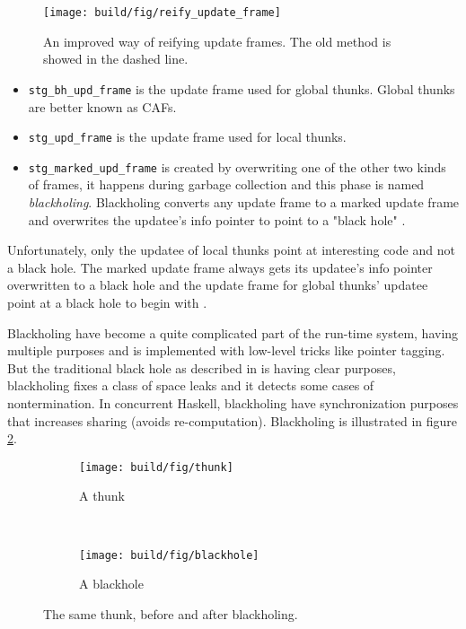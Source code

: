 \begin{figure}
\begin{mdframed}
  \texttt{[image: build/fig/reify\_update\_frame]}
  \caption{An improved way of reifying update frames. The old method is
  showed in the dashed line.}
  \label{fig:reify_update_frame}
\end{mdframed}
\end{figure}

\begin{itemize}
  \item
    \texttt{stg\_bh\_upd\_frame} is the update frame used for global
      thunks. Global thunks are better known as CAFs.
  \item
    \texttt{stg\_upd\_frame} is the update frame used for local
  thunks.
  \item
     \texttt{stg\_marked\_upd\_frame} is created
  by overwriting one of the other two kinds of frames, it
  happens during garbage collection and this phase is named
  \emph{blackholing}. Blackholing converts any update frame to a
  marked update frame \cite{github_overwrite_update_frame} and
  overwrites the updatee's info pointer to point to a "black hole"
  \cite{github_overwrite_blackhole}.
\end{itemize}

Unfortunately, only the updatee of local thunks point
at interesting code and not a black hole. The marked update frame
always gets its updatee's info pointer overwritten to a black
hole \cite{github_overwrite_blackhole} and the update frame
for global thunks' updatee point at a black hole to begin with
\cite{github_set_hdr_caf_blackhole}.

Blackholing have become a quite complicated part of the run-time system,
having multiple purposes \cite{ghc_new_implementation_black_holes}
and is implemented with low-level tricks like pointer tagging. But the
traditional black hole as described in \cite{jones1992tail} is having
clear purposes, blackholing fixes a class of space leaks and it detects
some cases of nontermination. In concurrent Haskell, blackholing have
synchronization purposes that increases sharing (avoids re-computation). Blackholing
is illustrated in figure \ref{fig:thunks_and_blackholes}.

\begin{figure}
\begin{mdframed}
  \begin{subfigure}[t]{0.5\textwidth}
    \texttt{[image: build/fig/thunk]}
    \caption{A thunk}
  \end{subfigure}
        ~ %
  \begin{subfigure}[t]{0.5\textwidth}
    \texttt{[image: build/fig/blackhole]}
    \caption{A blackhole}
  \end{subfigure}
  \caption{The same thunk, before and after blackholing.}\label{fig:thunks_and_blackholes}
\end{mdframed}
\end{figure}

